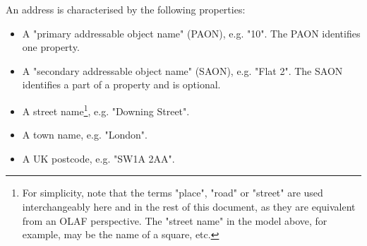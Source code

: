 An address is characterised by the following properties:

\begin{itemize}
    \item A "primary addressable object name" (PAON), e.g. "10". The PAON identifies one property.
    \item A "secondary addressable object name" (SAON), e.g. "Flat 2". The SAON identifies a part of a property and is optional.
    \item A street name\footnote{For simplicity, note that the terms "place", "road" or "street" are used interchangeably here and in the rest of this document, as they are equivalent from an OLAF perspective. The "street name" in the model above, for example, may be the name of a square, etc.}, e.g. "Downing Street".
    \item A town name, e.g. "London".
    \item A UK postcode, e.g. "SW1A 2AA".
\end{itemize}
